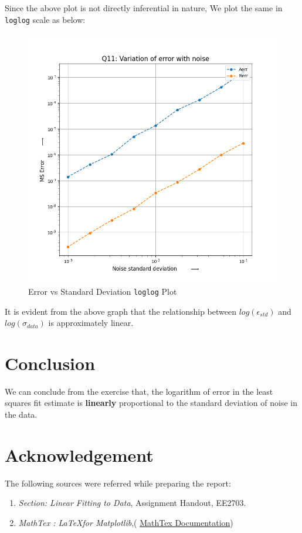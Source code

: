 \documentclass[11pt, a4paper]{article}
\begin{document}
            Since the above plot is not directly inferential in nature, We plot the same in \texttt{loglog} scale as below:
            \begin{figure}[H]
                \centering
                \includegraphics[scale=0.75]{error_plot_loglog.png}  %
                \caption{Error vs Standard Deviation \texttt{loglog} Plot}
                \label{fig:errorSTDloglog}
            \end{figure}

            It is evident from the above graph that the relationship between $log(\epsilon_{std})$ and $log(\sigma_{data})$ is approximately linear.

    \section{Conclusion}
        We can conclude from the exercise that, the logarithm of error in the least squares fit estimate is \textbf{linearly} proportional to the standard deviation of noise in the data.
    
    \section{Acknowledgement}
        The following sources were referred while preparing the report:
        \begin{enumerate}
            \item \textit{Section: Linear Fitting to Data}, Assignment Handout, EE2703.
            \item \textit{MathTex : \LaTeX for Matplotlib},( \href{{https://matplotlib.org/stable/tutorials/text/mathtext.html}}{MathTex Documentation})
        \end{enumerate}
\end{document}
